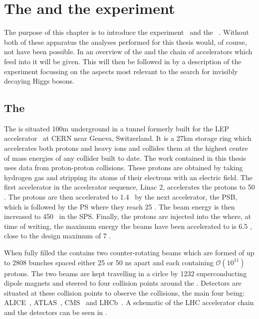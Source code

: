 \chapter{The \LHC and the \CMS experiment}
\label{chap:detector}

The purpose of this chapter is to introduce the \CMS experiment~\cite{Chatrchyan:2008aa} and the \LHC~\cite{1748-0221-3-08-S08001}. Without both of these apparatus the analyses performed for this thesis would, of course, not have been possible. In  an overview of the \LHC and the chain of accelerators which feed into it will be given. This will then be followed in  by a description of the \CMS experiment focussing on the aspects most relevant to the search for invisibly decaying Higgs bosons.

\section{The \LHC}
\label{sec:lhc}
The \LHC is situated 100m underground in a tunnel formerly built for the LEP accelerator~\cite{lepdesign} at CERN near Geneva, Switzerland. It is a 27km storage ring which accelerates both protons and heavy ions and collides them at the highest centre of mass energies of any collider built to date. The work contained in this thesis uses data from proton-proton collisions. These protons are obtained by taking hydrogen gas and stripping its atoms of their electrons with an electric field. The first accelerator in the \LHC accelerator sequence, Linac 2, accelerates the protons to 50 \MeV. The protons are then accelerated to 1.4 \GeV~by the next accelerator, the \ac{PSB}, which is followed by the \ac{PS} where they reach 25 \GeV. The beam energy is then increased to 450 \GeV~in the \ac{SPS}. Finally, the protons are injected into the \LHC where, at time of writing, the maximum energy the beams have been accelerated to is 6.5 \TeV, close to the design maximum of 7 \TeV.

When fully filled the \LHC contains two counter-rotating beams which are formed of up to 2808 bunches spaced either 25 or 50 ns apart and each containing $\mathcal{O}(10^{11})$ protons. The two beams are kept travelling in a cirlce by 1232 superconducting dipole magnets and steered to four collision points around the \LHC. Detectors are situated at these collision points to observe the collisions, the main four being: ALICE~\cite{Aamodt:2008zz}, ATLAS~\cite{Aad:1129811}, CMS~\cite{Chatrchyan:2008aa} and LHCb~\cite{Alves:2008zz}. A schematic of the LHC accelerator chain and the detectors can be seen in .

